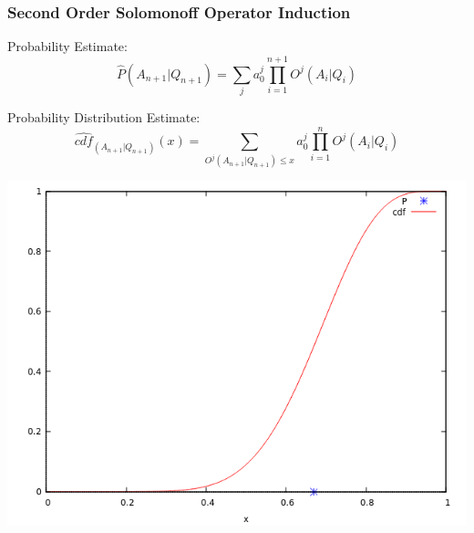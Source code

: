 \documentclass{beamer}
\begin{document}
\begin{frame}
  \frametitle{Second Order Solomonoff Operator Induction}

  
  Probability Estimate:
  $$
  \hat{P}(A_{n+1}|Q_{n+1}) = \sum_j a_0^j \prod_{i=1}^{n+1} O^j(A_i|Q_i)
  $$

  
  Probability Distribution Estimate:
  $$
    \hat{cdf}_{(A_{n+1}|Q_{n+1})}(x) = \sum_{O^j(A_{n+1}|Q_{n+1}) \le x}
    a_0^j \prod_{i=1}^{n} O^j(A_i|Q_i)
  $$



  \begin{center}
    \includegraphics[scale=0.28]{images/P_vs_CDF_alpha.png}
  \end{center}


\end{frame}
\end{document}
